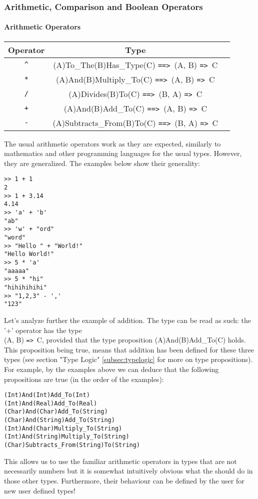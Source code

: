 \documentclass{article}
\def\ra{\texttt{=>}\ }
\def\Ra{\texttt{==>}\ }
\begin{document}
\subsubsection{Arithmetic, Comparison and Boolean Operators}

\paragraph{Arithmetic Operators}
\begin{center}
\begin{tabular}{ |c|c|c| } 
\hline
Operator & Type \\ 
\hline
\hline
\texttt{\^} & (A)To_The(B)Has_Type(C) \Ra (A, B) \ra C \\
\hline
\texttt{*} & (A)And(B)Multiply_To(C) \Ra (A, B) \ra C \\
\hline
\texttt{/} & (A)Divides(B)To(C) \Ra (B, A) \ra C \\
\hline
\texttt{+} & (A)And(B)Add_To(C) \Ra (A, B) \ra C \\ 
\hline
\texttt{-} & (A)Subtracts_From(B)To(C) \Ra (B, A) \ra C \\
\hline
\end{tabular}
\end{center}
The usual arithmetic operators work as they are expected, similarly to
mathematics and other programming languages for the usual types. However, they
are generalized. The examples below show their generality:
\begin{verbatim}
>> 1 + 1
2
>> 1 + 3.14
4.14
>> 'a' + 'b'
"ab"
>> 'w' + "ord"
"word"
>> "Hello " + "World!"
"Hello World!"
>> 5 * 'a'
"aaaaa"
>> 5 * "hi"
"hihihihihi"
>> "1,2,3" - ','
"123"
\end{verbatim}
Let's analyze further the example of addition. The type can be read as such:
the '+' operator has the type \\ (A, B) \ra C, provided that the type
proposition (A)And(B)Add_To(C) holds. This proposition being true, means that
addition has been defined for these three types (see section "Type Logic"
\ref{subsec:typelogic} for more on type propositions). For example, by the examples
above we can deduce that the following propositions are true (in the order of the 
examples):
\begin{verbatim}
(Int)And(Int)Add_To(Int)
(Int)And(Real)Add_To(Real)
(Char)And(Char)Add_To(String)
(Char)And(String)Add_To(String)
(Int)And(Char)Multiply_To(String)
(Int)And(String)Multiply_To(String)
(Char)Subtracts_From(String)To(String)
\end{verbatim}
This allows us to use the familiar arithmetic operators in types that are not
necessarily numbers but it is somewhat intuitively obvious what the should do
in those other types. Furthermore, their behaviour can be defined by the user
for new user defined types!
\end{document}
